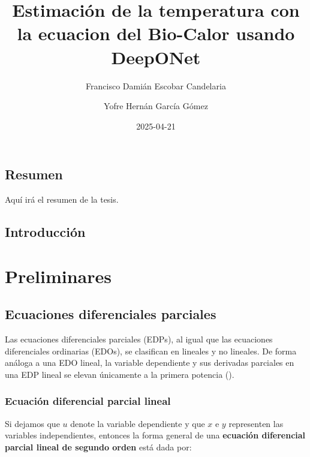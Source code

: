\documentclass[
  spanish,
  us-letterpaper,
  DIV=11,
  numbers=noendperiod]{scrreprt}
\title{Estimación de la temperatura con la ecuacion del Bio-Calor usando
DeepONet}
\author{Francisco Damián Escobar Candelaria \and Yofre Hernán García
Gómez}
\date{2025-04-21}
\renewcommand*\contentsname{Tabla de contenidos}
\newcommand\contentsname{Tabla de contenidos}
\theoremstyle{plain}
\theoremstyle{definition}
\theoremstyle{remark}
\begin{document}
\maketitle

\renewcommand*\contentsname{Tabla de contenidos}
{
\hypersetup{linkcolor=}
\setcounter{tocdepth}{2}
\tableofcontents
}


\chapter*{Resumen}\label{resumen}


Aquí irá el resumen de la tesis.


\chapter{Introducción}\label{introducciuxf3n}

\part{Preliminares}

\chapter{Ecuaciones diferenciales
parciales}\label{ecuaciones-diferenciales-parciales}

Las ecuaciones diferenciales parciales (EDPs), al igual que las
ecuaciones diferenciales ordinarias (EDOs), se clasifican en lineales y
no lineales. De forma análoga a una EDO lineal, la variable dependiente
y sus derivadas parciales en una EDP lineal se elevan únicamente a la
primera potencia ().

\section{Ecuación diferencial parcial
lineal}\label{ecuaciuxf3n-diferencial-parcial-lineal}

Si dejamos que \(u\) denote la variable dependiente y que \(x\) e \(y\)
representen las variables independientes, entonces la forma general de
una \textbf{ecuación diferencial parcial lineal de segundo orden} está
dada por:
\end{document}
